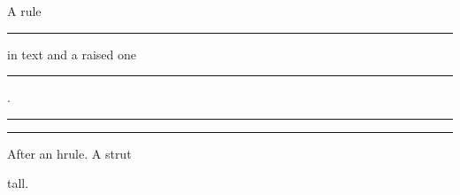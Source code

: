 \documentclass{article}
\begin{document}
A rule \rule{2cm}{0.4pt} in text and a raised one \rule[1ex]{1cm}{2pt}.

\noindent\rule{\textwidth}{1pt}

\hrule
After an hrule. A strut \rule{0pt}{20pt}tall.
\end{document}
